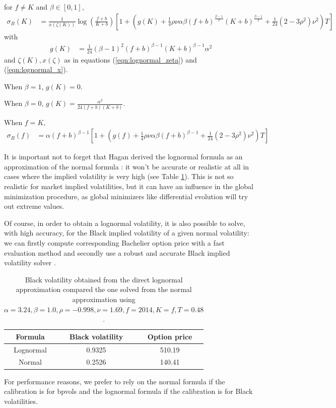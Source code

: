 \documentclass[]{rAMF2e}
\begin{document}
for $f \neq K$ and $\beta \in [0,1]$,
\begin{align}\label{eqn:lognormal_sabr}
\sigma_B(K) &= \frac{1}{x(\zeta(K))}\log\left(\frac{f+b}{K+b}\right)\left[1+\left(g(K)+\frac{1}{4}\rho\nu\alpha\beta(f+b)^{\frac{\beta-1}{2}}(K+b)^{\frac{\beta-1}{2}}+\frac{1}{24}(2-3\rho^2)\nu^2\right)T\right]
\end{align}
with 
\begin{align}
g(K) &= \frac{1}{24} (\beta-1)^2 (f+b)^{\beta-1} (K+b)^{\beta-1} \alpha^2
\end{align}
and $\zeta(K), x(\zeta)$ as in equations (\ref{eqn:lognormal_zeta}) and (\ref{eqn:lognormal_x}).

When $\beta = 1$, $g(K) = 0$. 

When $\beta = 0$, $g(K) = \frac{\alpha^2}{24(f+b)(K+b)}$.

When $f=K$, 
\begin{align}
\sigma_B(f) &= \alpha (f+b)^{\beta-1} \left[1+\left(g(f)+\frac{1}{4}\rho\nu\alpha\beta(f+b)^{\beta-1}+\frac{1}{24}(2-3\rho^2)\nu^2\right)T\right]
\end{align}

It is important not to forget that Hagan derived the lognormal formula as an approximation of the normal formula \citep{hagan2002managing}: it won't be accurate or realistic at all in cases where the implied volatility is very high (see Table \ref{tbl:lognormal_high_alpha}). This is not so realistic for market implied volatilities, but it can have an influence in the global minimization procedure, as global minimizers like differential evolution will try out extreme values.

Of course, in order to obtain a lognormal volatility, it is also possible to solve, with high accuracy, for the Black implied volatility of a given normal volatility: we can firstly compute corresponding Bachelier option price with a fast evaluation method \citep{lefloch2014bpvol} and secondly use a robust and accurate Black implied volatility solver \citep{jackel2013let, li2011adaptive}.

\begin{table}[h]
\begin{center}
\caption{\label{tbl:lognormal_high_alpha}Black volatility obtained from the direct lognormal approximation compared the one solved from the normal approximation using $\alpha=3.24,\beta=1.0,\rho=-0.998, \nu=1.69, f=2014, K=f, T=0.48$.}
\begin{tabular}{c c c}
\hline
Formula & Black volatility & Option price \\ 
\hline
Lognormal & 0.9325 & 510.19 \\
Normal & 0.2526 & 140.41 \\
\hline
\end{tabular}
\end{center}
\end{table}
For performance reasons, we prefer to rely on the normal formula if the calibration is for bpvols and the lognormal formula if the calibration is for Black volatilities.
\end{document}
